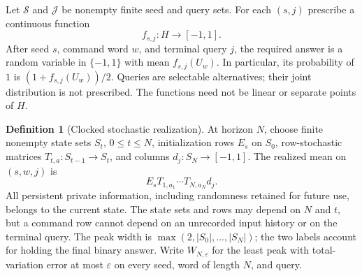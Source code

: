 \documentclass[11pt]{amsart}
\numberwithin{equation}{section}
\theoremstyle{definition}
\newtheorem{definition}[theorem]{Definition}
\theoremstyle{remark}
\begin{document}
Let $\mathcal S$ and $\mathcal J$ be nonempty finite seed and query sets. For each $(s,j)$ prescribe a continuous function
\[
 f_{s,j}:H\longrightarrow[-1,1].
\]
After seed $s$, command word $w$, and terminal query $j$, the required answer is a random variable in $\{-1,1\}$ with mean $f_{s,j}(U_w)$. In particular, its probability of $1$ is $(1+f_{s,j}(U_w))/2$. Queries are selectable alternatives; their joint distribution is not prescribed. The functions need not be linear or separate points of $H$.

\begin{definition}[Clocked stochastic realization]\label{def:machine53}
At horizon $N$, choose finite nonempty state sets $S_t$, $0\le t\le N$, initialization rows $E_s$ on $S_0$, row-stochastic matrices $T_{t,a}:S_{t-1}\to S_t$, and columns $d_j:S_N\to[-1,1]$. The realized mean on $(s,w,j)$ is
\[
 E_sT_{1,a_1}\cdots T_{N,a_N}d_j.
\]
All persistent private information, including randomness retained for future use, belongs to the current state. The state sets and rows may depend on $N$ and $t$, but a command row cannot depend on an unrecorded input history or on the terminal query. The peak width is $\max(2,|S_0|,\ldots,|S_N|)$; the two labels account for holding the final binary answer. Write $W_{N,\varepsilon}$ for the least peak with total-variation error at most $\varepsilon$ on every seed, word of length $N$, and query.
\end{definition}
\end{document}
